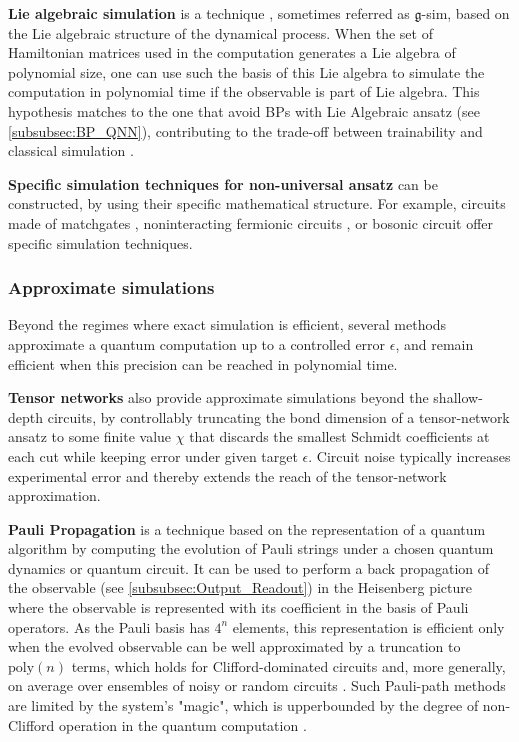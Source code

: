 \documentclass[aps,10pt,groupedaddress,prx,superscriptaddress,twocolumn,balancelastpage, tightenlines]{revtex4-2}
\theoremstyle{plain}  %
\begin{document}
\textbf{Lie algebraic simulation} is a technique \cite{goh_lie-algebraic_2025, barligea_enabling_2026}, sometimes referred as $\mathfrak{g}$-sim, based on the Lie algebraic structure of the dynamical process. When the set of Hamiltonian matrices used in the computation generates a Lie algebra of polynomial size, one can use such the basis of this Lie algebra to simulate the computation in polynomial time if the observable is part of Lie algebra. This hypothesis matches to the one that avoid \gls{BP}s with Lie Algebraic ansatz (see \autoref{subsubsec:BP_QNN}), contributing to the trade-off between trainability and classical simulation \cite{cerezo_does_2025}. 


\textbf{Specific simulation techniques for non-universal ansatz} can be constructed, by using their specific mathematical structure. For example, circuits made of matchgates \cite{jozsa_matchgates_2008}, noninteracting fermionic circuits \cite{terhal_classical_2002}, or bosonic circuit \cite{bartlett_efficient_2002, clifford_classical_2018, quesada_exact_2020, quesada_simulating_2019, chabaud_classical_2021, bourassa_fast_2021, lim_classical_2025, seron_efficient_2024} offer specific simulation techniques.  

    \subsubsection*{Approximate simulations}

\noindent Beyond the regimes where exact simulation is efficient, several methods approximate a quantum computation up to a controlled error $\epsilon$, and remain efficient when this precision can be reached in polynomial time.

\textbf{Tensor networks} also provide approximate simulations beyond the shallow-depth circuits, by controllably truncating the bond dimension of a tensor-network ansatz to some finite value $\chi$ that discards the smallest Schmidt coefficients at each cut \cite{berezutskii_tensor_2025} while keeping error under given target $\epsilon$. Circuit noise typically increases experimental error and thereby extends the reach of the tensor-network approximation.

\textbf{Pauli Propagation}  \cite{rudolph_classical_2023, rudolph_pauli_2025, Begusic2024fast, shao_simulating_2024, angrisani_classically_2025} is a technique based on the representation of a quantum algorithm by computing the evolution of Pauli strings under a chosen quantum dynamics or quantum circuit. It can be used to perform  a back propagation of the observable (see \autoref{subsubsec:Output_Readout}) in the Heisenberg picture where the observable is represented with its coefficient in the basis of Pauli operators. As the Pauli basis has $4^n$ elements, this representation is efficient only when the evolved observable can be well approximated by a truncation to $\mathrm{poly}(n)$ terms, which holds for Clifford-dominated circuits and, more generally, on average over ensembles of noisy or random circuits \cite{angrisani_classically_2025}. Such Pauli-path methods are limited by the system’s "magic", which is upperbounded by the degree of non-Clifford operation in the quantum computation \cite{lin_utility-scale_2026}.
\end{document}
